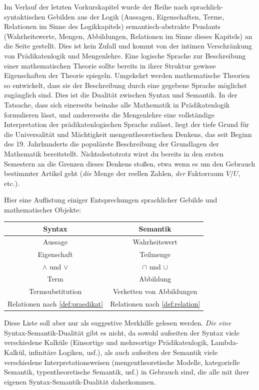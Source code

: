 \begin{bem} \label{syntaxvssemantik}
    Im Verlauf der letzten Vorkurskapitel wurde der Reihe nach sprachlich-syntaktischen Gebilden aus der Logik (Aussagen, Eigenschaften, Terme, Relationen im Sinne des Logikkapitels) semantisch-abstrakte Pendants (Wahrheitswerte, Mengen, Abbildungen, Relationen im Sinne dieses Kapitels) an die Seite gestellt. Dies ist kein Zufall und kommt von der intimen Verschränkung von Prädikatenlogik und Mengenlehre. Eine logische Sprache zur Beschreibung einer mathematischen Theorie sollte bereits in ihrer Struktur gewisse Eigenschaften der Theorie spiegeln. Umgekehrt werden mathematische Theorien so entwickelt, dass sie der Beschreibung durch eine gegebene Sprache möglichst zugänglich sind. Dies ist die Dualität zwischen Syntax und Semantik. In der Tatsache, dass sich einerseits beinahe alle Mathematik in Prädikatenlogik formulieren lässt, und andererseits die Mengenlehre eine vollständige Interpretation der prädikatenlogischen Sprache zulässt, liegt der tiefe Grund für die Universalität und Mächtigkeit mengentheoretischen Denkens, das seit Beginn des 19. Jahrhunderts die populärste Beschreibung der Grundlagen der Mathematik bereitstellt. Nichtsdestotrotz wirst du bereits in den ersten Semestern an die Grenzen dieses Denkens stoßen, etwa wenn es um den Gebrauch bestimmter Artikel geht (\emph{die} Menge der reellen Zahlen, \emph{der} Faktorraum $V/U$, etc.).

    Hier eine Auflistung einiger Entsprechungen sprachlicher Gebilde und mathematischer Objekte:
    \begin{longtable}{cc}
        Syntax & Semantik \\
        \midrule
        Aussage & Wahrheitswert \\
        Eigenschaft & Teilmenge \\
        $\land$ und $\lor$ & $\cap$ und $\cup$ \\
        Term & Abbildung \\
        Termsubstitution & Verketten von Abbildungen \\
        Relationen nach \cref{def:praedikat} & Relationen nach \cref{def:relation} \\
    \end{longtable}
    Diese Liste soll aber nur als suggestive Merkhilfe gelesen werden. \emph{Die eine} Syntax-Semantik-Dualität gibt es nicht, da sowohl aufseiten der Syntax viele verschiedene Kalküle (Einsortige und mehrsortige Prädikatenlogik, Lambda-Kalkül, infinitäre Logiken, usf.), als auch aufseiten der Semantik viele verschiedene Interpretationsweisen (mengentheoretische Modelle, kategorielle Semantik, typentheoretische Semantik, usf.) in Gebrauch sind, die alle mit ihrer eigenen Syntax-Semantik-Dualität daherkommen.
\end{bem}


